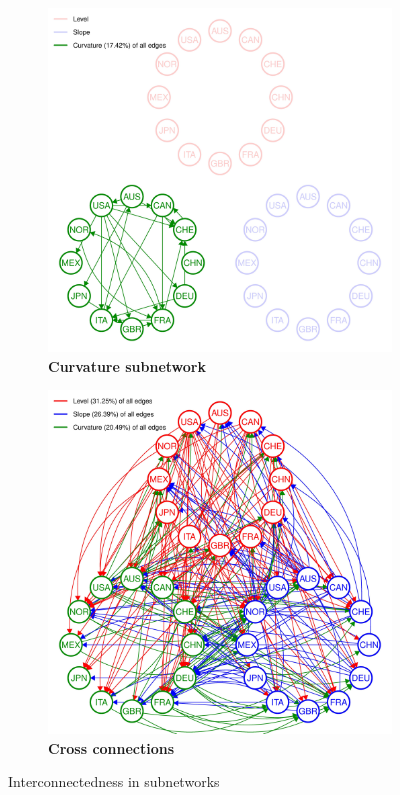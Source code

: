 \documentclass[12pt,bibliography=totoc]{article}
\begin{document}
\begin{figure}[H]
  \medskip

  \begin{subfigure}[t]{.5\textwidth}
    \centering
    \includegraphics[width=\linewidth]{All_plot_onlycurv_2004-07-01_2019-12-31_0.01-page-001}
    \caption{\textbf{Curvature subnetwork}}
  \end{subfigure}
  \hfill
  \begin{subfigure}[t]{.5\textwidth}
    \centering
    \includegraphics[width=\linewidth]{All_plot_innerempty_2004-07-01_2019-12-31_0.01-page-001}
    \caption{\textbf{Cross connections}}
  \end{subfigure}
  \caption{Interconnectedness in subnetworks}
\end{figure}
\end{document}
